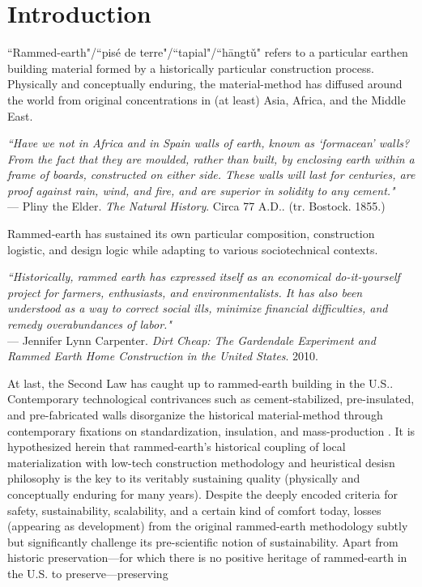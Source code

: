\section{Introduction}


``Rammed-earth"/``pis\'e de terre"/``tapial"/``h\=angt\v u" refers to a particular earthen building material formed by a historically particular construction process. Physically and conceptually enduring, the material-method has diffused around the world from original concentrations in (at least) Asia, Africa, and the Middle East. \cite{RAMMEDEARTHHOUSE}

\begin{flushright}
\small{
\textit{``Have we not in Africa and in Spain walls of earth, known as `formacean' walls? From the fact that they are moulded, rather than built, by enclosing earth within a frame of boards, constructed on either side. These walls will last for centuries, are proof against rain, wind, and fire, and are superior in solidity to any cement."}}\\ --- Pliny the Elder. \textit{The Natural History}. Circa 77 A.D.. (tr. Bostock. 1855.)
\end{flushright}

Rammed-earth has sustained its own particular composition, construction logistic, and design logic while adapting to various sociotechnical contexts.

\begin{flushright}
\small{
\textit{
``Historically, rammed earth has expressed itself as an economical do-it-yourself project for farmers, enthusiasts, and environmentalists. It has also been understood as a way to correct social ills, minimize financial difficulties, and remedy overabundances of labor."}}\\ --- Jennifer Lynn Carpenter. \textit{Dirt Cheap: The Gardendale Experiment and Rammed Earth Home Construction in the United States}. 2010.
\end{flushright}

At last, the Second Law has caught up to rammed-earth building in the U.S.. Contemporary technological contrivances such as cement-stabilized, pre-insulated, and pre-fabricated walls disorganize the historical material-method through contemporary fixations on standardization, insulation, and mass-production \cite{MOECONVERGENCE}. It is hypothesized herein that rammed-earth's historical coupling of local materialization with low-tech construction methodology and heuristical desisn philosophy is the key to its veritably sustaining quality (physically and conceptually enduring for many years). Despite the deeply encoded criteria for safety, sustainability, scalability, and a certain kind of comfort today, losses (appearing as development) from the original rammed-earth methodology subtly but significantly challenge its pre-scientific notion of sustainability. Apart from historic preservation---for which there is no positive heritage of rammed-earth in the U.S. to preserve---preserving

